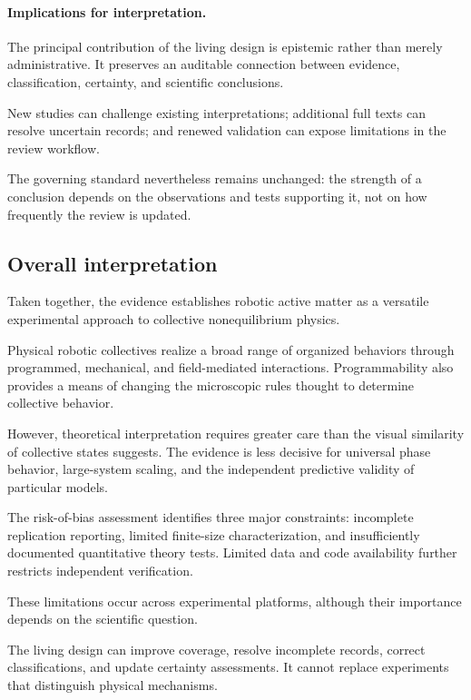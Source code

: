 \paragraph*{Implications for interpretation.}

The principal contribution of the living design
is epistemic rather than merely administrative.
It preserves an auditable connection between
evidence, classification, certainty, and
scientific conclusions.

New studies can challenge existing interpretations;
additional full texts can resolve uncertain records;
and renewed validation can expose limitations
in the review workflow.

The governing standard nevertheless remains
unchanged: the strength of a conclusion depends
on the observations and tests supporting it,
not on how frequently the review is updated.

\subsection{Overall interpretation}
\label{sec:discussion-overall}

Taken together, the evidence establishes
robotic active matter as a versatile
experimental approach to collective
nonequilibrium physics.

Physical robotic collectives realize
a broad range of organized behaviors
through programmed, mechanical,
and field-mediated interactions.
Programmability also provides a means
of changing the microscopic rules
thought to determine collective behavior.

However, theoretical interpretation
requires greater care than the visual
similarity of collective states suggests.
The evidence is less decisive for
universal phase behavior, large-system
scaling, and the independent predictive
validity of particular models.

The risk-of-bias assessment identifies
three major constraints: incomplete
replication reporting, limited
finite-size characterization, and
insufficiently documented quantitative
theory tests. Limited data and code
availability further restricts
independent verification.

These limitations occur across
experimental platforms, although
their importance depends on the
scientific question.

The living design can improve
coverage, resolve incomplete records,
correct classifications, and update
certainty assessments. It cannot
replace experiments that distinguish
physical mechanisms.

